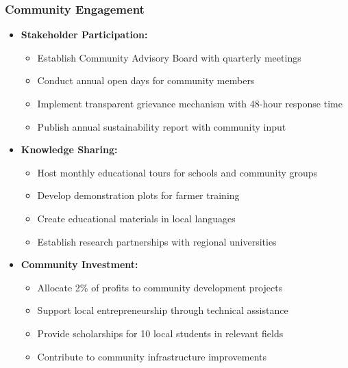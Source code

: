 \subsubsection{Community Engagement}
\begin{itemize}
    \item \textbf{Stakeholder Participation:}
    \begin{itemize}
        \item Establish Community Advisory Board with quarterly meetings
        \item Conduct annual open days for community members
        \item Implement transparent grievance mechanism with 48-hour response time
        \item Publish annual sustainability report with community input
    \end{itemize}
    
    \item \textbf{Knowledge Sharing:}
    \begin{itemize}
        \item Host monthly educational tours for schools and community groups
        \item Develop demonstration plots for farmer training
        \item Create educational materials in local languages
        \item Establish research partnerships with regional universities
    \end{itemize}
    
    \item \textbf{Community Investment:}
    \begin{itemize}
        \item Allocate 2\% of profits to community development projects
        \item Support local entrepreneurship through technical assistance
        \item Provide scholarships for 10 local students in relevant fields
        \item Contribute to community infrastructure improvements
    \end{itemize}
\end{itemize}

